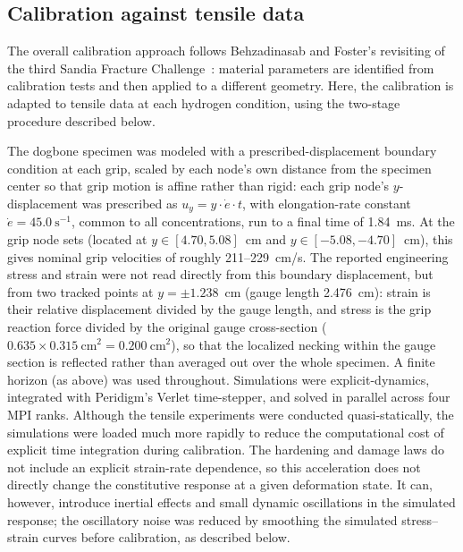\documentclass[pdflatex,sn-mathphys-num]{sn-jnl}%
\theoremstyle{thmstyleone}%
\theoremstyle{thmstyletwo}%
\theoremstyle{thmstylethree}%
\begin{document}
\subsection{Calibration against tensile data}\label{subsec2c}

The overall calibration approach follows Behzadinasab and Foster's revisiting of the third Sandia Fracture Challenge~\cite{behzadinasab2020revisiting}: material parameters are identified from calibration tests and then applied to a different geometry. Here, the calibration is adapted to tensile data at each hydrogen condition, using the two-stage procedure described below.

The dogbone specimen was modeled with a prescribed-displacement boundary condition at each grip,
scaled by each node's own distance from the specimen center so that grip motion is affine rather
than rigid: each grip node's $y$-displacement was prescribed as $u_y = y \cdot \dot{e} \cdot t$, with
elongation-rate constant $\dot{e} = 45.0~\mathrm{s}^{-1}$, common to all concentrations, run to a
final time of 1.84~ms. At the grip node sets (located at $y \in [4.70, 5.08]$~cm and $y \in
[-5.08, -4.70]$~cm), this gives nominal grip velocities of roughly 211--229~cm/s. The reported
engineering stress and strain were not read directly from this boundary displacement, but from two
tracked points at $y = \pm 1.238$~cm (gauge length 2.476~cm): strain is their relative displacement
divided by the gauge length, and stress is the grip reaction force divided by the original gauge
cross-section ($0.635 \times 0.315~\mathrm{cm}^2 = 0.200~\mathrm{cm}^2$), so that the localized
necking within the gauge section is reflected rather than averaged out over the whole specimen. A
finite horizon (as above) was used throughout. Simulations were explicit-dynamics, integrated with
Peridigm's Verlet time-stepper, and solved in parallel across four MPI ranks.
Although the tensile experiments were conducted quasi-statically, the simulations were loaded much
more rapidly to reduce the computational cost of explicit time integration during calibration.
The hardening and damage laws do not include an explicit strain-rate dependence, so this acceleration
does not directly change the constitutive response at a given deformation state. It can, however,
introduce inertial effects and small dynamic oscillations in the simulated response; the oscillatory
noise was reduced by smoothing the simulated stress--strain curves before calibration, as described
below.
\end{document}
